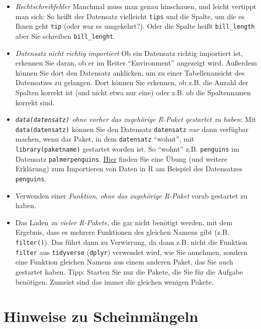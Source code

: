 \documentclass[
  a4paper,
  DIV=11]{scrreprt}
\providecommand{\tightlist}{%
  \setlength{\itemsep}{0pt}\setlength{\parskip}{0pt}}\usepackage{longtable,booktabs,array}
\theoremstyle{definition}
\theoremstyle{remark}
\begin{document}
\begin{itemize}
\tightlist
\item
  \emph{Rechtschreibfehler} Manchmal muss man genau hinschauen, und
  leicht vertippt man sich: So heißt der Datensatz vielleicht
  \texttt{tips} und die Spalte, um die es Ihnen geht \texttt{tip} (oder
  war es umgekehrt?). Oder die Spalte heißt \texttt{bill\_length} aber
  Sie schreiben \texttt{bill\_lenght}.
\item
  \emph{Datensatz nicht richtig importiert} Ob ein Datensatz richtig
  importiert ist, erkennen Sie daran, ob er im Reiter ``Environment''
  angezeigt wird. Außerdem können Sie dort den Datensatz anklicken, um
  zu einer Tabellenansicht des Datensatzes zu gelangen. Dort können Sie
  erkennen, ob z.B. die Anzahl der Spalten korrekt ist (und nicht etwa
  nur eine) oder z.B. ob die Spaltennamen korrekt sind.
\item
  \emph{\texttt{data(datensatz)} ohne vorher das zugehörige R-Paket
  gestartet zu haben}: Mit \texttt{data(datensatz)} können Sie den
  Datensatz \texttt{datensatz} \emph{nur} dann verfügbar machen, wenn
  das Paket, in dem \texttt{datensatz} ``wohnt'', mit
  \texttt{library(paketname)} gestartet worden ist. So ``wohnt'' z.B.
  \texttt{penguins} im Datensatz \texttt{palmerpenguins}.
  \href{https://datenwerk.netlify.app/post/pfad/pfad/}{Hier} finden Sie
  eine Übung (und weitere Erklärung) zum Importieren von Daten in R am
  Beispiel des Datensatzes \texttt{penguins}.
\item
  Verwenden einer \emph{Funktion, ohne das zugehörige R-Paket} vorab
  gestartet zu haben.
\item
  Das Laden \emph{zu vieler R-Pakete}, die gar nicht benötigt werden,
  mit dem Ergebnis, dass es mehrere Funktionen des gleichen Namens gibt
  (z.B. \texttt{filter()}). Das führt dann zu Verwirrung, da dann z.B.
  nicht die Funktion \texttt{filter} aus \texttt{tidyverse}
  (\texttt{dplyr}) verwendet wird, wie Sie annehmen, sondern eine
  Funktion gleichen Namens aus einem anderen Paket, das Sie auch
  gestartet haben. Tipp: Starten Sie nur die Pakete, die Sie für die
  Aufgabe benötigen. Zumeist sind das immer die gleichen wenigen Pakete.
\end{itemize}

\hypertarget{hinweise-zu-scheinmuxe4ngeln}{%
\section{Hinweise zu Scheinmängeln}\label{hinweise-zu-scheinmuxe4ngeln}}
\end{document}
